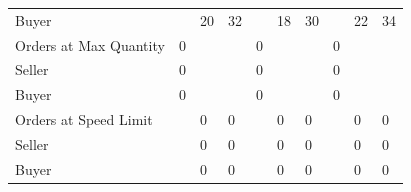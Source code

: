 \begin{tabular}{llllllllll}
 Buyer                  &          & 20            & 32            &          & 18            & 30            &           & 22            & 34            \\
 Orders at Max Quantity & 0        &               &               & 0        &               &               & 0         &               &               \\
 Seller                 & 0        &               &               & 0        &               &               & 0         &               &               \\
 Buyer                  & 0        &               &               & 0        &               &               & 0         &               &               \\
 Orders at Speed Limit  &          & 0             & 0             &          & 0             & 0             &           & 0             & 0             \\
 Seller                 &          & 0             & 0             &          & 0             & 0             &           & 0             & 0             \\
 Buyer                  &          & 0             & 0             &          & 0             & 0             &           & 0             & 0             \\
\hline
\end{tabular}